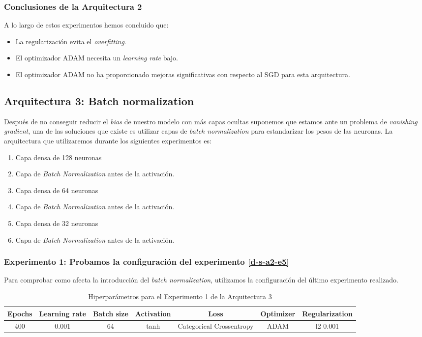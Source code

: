 \documentclass{article}
\begin{document}
		\subsubsection{Conclusiones de la Arquitectura 2}
		\label{d-cl-a2}
			A lo largo de estos experimentos hemos concluido que:
			\begin{itemize}
				\item La regularizaci\'on evita el \textit{overfitting}.
				\item El optimizador ADAM necesita un \textit{learning rate} bajo.
				\item El optimizador ADAM no ha proporcionado mejoras significativas con respecto al SGD para esta arquitectura.
			\end{itemize}
			
	\subsection{Arquitectura 3: Batch normalization}
	\label{d-s-a3}
		Despu\'es de no conseguir reducir el \textit{bias} de nuestro modelo con m\'as capas ocultas suponemos que estamos ante un problema de \textit{vanishing gradient}, una de las soluciones que existe es utilizar capas de \textit{batch normalization} para estandarizar los pesos de las neuronas. La arquitectura que utilizaremos durante los siguientes experimentos es:
		\begin{enumerate}
			\item Capa densa de 128 neuronas
			\item Capa de \textit{Batch Normalization} antes de la activaci\'on.
			\item Capa densa de 64 neuronas
			\item Capa de \textit{Batch Normalization} antes de la activaci\'on.
			\item Capa densa de 32 neuronas
			\item Capa de \textit{Batch Normalization} antes de la activaci\'on.
		\end{enumerate}
		
		\subsubsection{Experimento 1: Probamos la configuraci\'on del experimento \ref{d-s-a2-e5}}
		\label{d-s-a3-e1}
			Para comprobar como afecta la introducci\'on del \textit{batch normalization}, utilizamos la configuraci\'on del \'ultimo experimento realizado.
			
			\begin{table}[!h]
				\begin{tabular}{| c | c | c | c | c | c | c |}
					\textbf{Epochs} & \textbf{Learning rate} & \textbf{Batch size} & \textbf{Activation} & \textbf{Loss} & \textbf{Optimizer} & \textbf{Regularization} \\ \hline
					400 & 0.001 & 64 & tanh & Categorical Crossentropy & ADAM & l2 0.001
				\end{tabular}
				\caption{Hiperpar\'ametros para el Experimento 1 de la Arquitectura 3}
				\label{tab:hip-d-a3-e1}
			\end{table}
			
\end{document}
